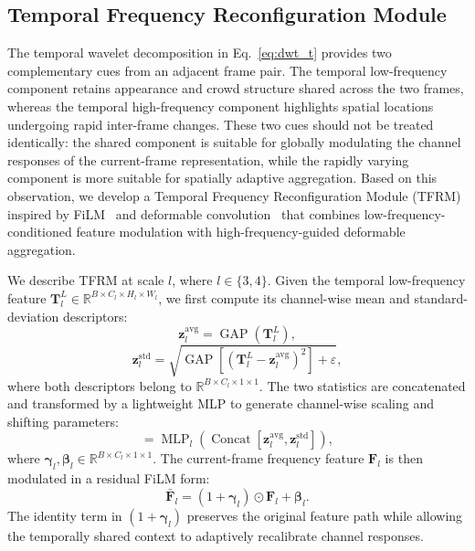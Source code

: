 \documentclass[lettersize,journal]{IEEEtran}
\begin{document}
\vspace{-0.5em}
\subsection{Temporal Frequency Reconfiguration Module}
\label{TFRM}
The temporal wavelet decomposition in Eq.~\eqref{eq:dwt_t} provides two complementary cues from an adjacent frame pair. The temporal low-frequency component retains appearance and crowd structure shared across the two frames, whereas the temporal high-frequency component highlights spatial locations undergoing rapid inter-frame changes. These two cues should not be treated identically: the shared component is suitable for globally modulating the channel responses of the current-frame representation, while the rapidly varying component is more suitable for spatially adaptive aggregation. Based on this observation, we develop a Temporal Frequency Reconfiguration Module (TFRM) inspired by FiLM~\cite{perez2018film} and deformable convolution~\cite{zhu2019deformable} that combines low-frequency-conditioned feature modulation with high-frequency-guided deformable aggregation.

We describe TFRM at scale $l$, where $l\in\{3,4\}$. Given the temporal low-frequency feature
$\mathbf{T}_{l}^{L}\in\mathbb{R}^{B\times C_l\times H_l\times W_l}$,
we first compute its channel-wise mean and standard-deviation descriptors:
\begin{equation}
\mathbf{z}_{l}^{\mathrm{avg}}
=
\operatorname{GAP}(\mathbf{T}_{l}^{L}),
\end{equation}
\begin{equation}
\mathbf{z}_{l}^{\mathrm{std}}
=
\sqrt{
\operatorname{GAP}
\left[
\left(
\mathbf{T}_{l}^{L}
-
\mathbf{z}_{l}^{\mathrm{avg}}
\right)^{2}
\right]
+
\varepsilon
},
\end{equation}
where both descriptors belong to
$\mathbb{R}^{B\times C_l\times1\times1}$.
The two statistics are concatenated and transformed by a lightweight MLP to generate channel-wise scaling and shifting parameters:
\begin{equation}
[\boldsymbol{\gamma}_{l},\boldsymbol{\beta}_{l}]
=
\operatorname{MLP}_{l}
\left(
\operatorname{Concat}
\left[
\mathbf{z}_{l}^{\mathrm{avg}},
\mathbf{z}_{l}^{\mathrm{std}}
\right]
\right),
\end{equation}
where
$\boldsymbol{\gamma}_{l},\boldsymbol{\beta}_{l}
\in\mathbb{R}^{B\times C_l\times1\times1}$.
The current-frame frequency feature $\mathbf{F}_{l}$ is then modulated in a residual FiLM form:
\begin{equation}
\bar{\mathbf{F}}_{l}
=
\left(1+\boldsymbol{\gamma}_{l}\right)
\odot
\mathbf{F}_{l}
+
\boldsymbol{\beta}_{l}.
\label{eq:film}
\end{equation}
The identity term in $(1+\boldsymbol{\gamma}_{l})$ preserves the original feature path while allowing the temporally shared context to adaptively recalibrate channel responses.
\end{document}

